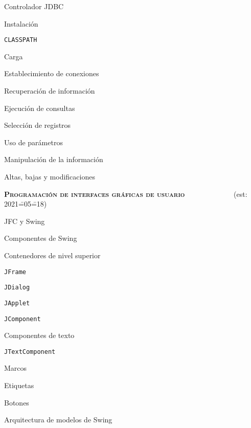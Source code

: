 \begin{longenum}
    \begin{longenum}
        \item Controlador JDBC
        \begin{longenum}
            \item Instalación
            \item \texttt{CLASSPATH}
            \item Carga
        \end{longenum}
        \item Establecimiento de conexiones
        \item Recuperación de información
        \begin{longenum}
            \item Ejecución de consultas
            \item Selección de registros
            \item Uso de parámetros
        \end{longenum}
        \item Manipulación de la información
        \begin{longenum}
            \item Altas, bajas y modificaciones
        \end{longenum}
    \end{longenum}
    \item \textbf{\textsc{Programación de interfaces gráficas de usuario}} \ \ \ \ \ \ \ \ \ \ \ \ \ (est: 2021\==05\==18)
    \begin{longenum}
        \item JFC y Swing
        \item Componentes de Swing
        \item Contenedores de nivel superior
        \begin{longenum}
            \item \texttt{JFrame}
            \item \texttt{JDialog}
            \item \texttt{JApplet}
        \end{longenum}
        \item \texttt{JComponent}
        \item Componentes de texto
        \begin{longenum}
            \item \texttt{JTextComponent}
        \end{longenum}
        \item Marcos
        \item Etiquetas
        \item Botones
        \item Arquitectura de modelos de Swing
    \end{longenum}
\end{longenum}

